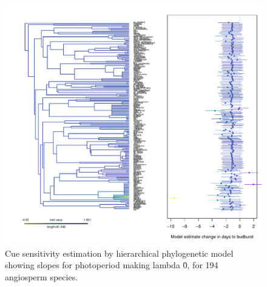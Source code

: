 \documentclass{article}\usepackage[]{graphicx}\usepackage[]{color}
\begin{document}
\begin{figure} [H]
  \begin{center}
  \includegraphics[width=14cm]{..//..//analyses/phylogeny/figures/muplot_phylo_photo_lambda0.pdf}
  \caption{Cue sensitivity estimation by hierarchical phylogenetic model showing slopes for photoperiod making lambda \= 0, for 194 angiosperm species.}
  \label{fig:muplot_photo_lambda0}
  \end{center}
\end{figure}
\end{document}

